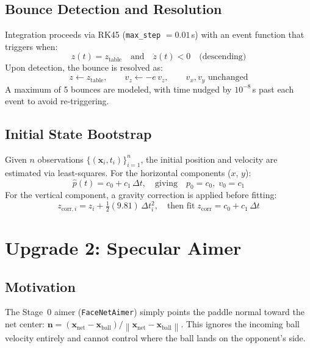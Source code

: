 \documentclass[11pt,letterpaper]{article}
\newcommand{\vv}[1]{\mathbf{#1}}
\newcommand{\norm}[1]{\left\|#1\right\|}
\begin{document}
\subsection{Bounce Detection and Resolution}

Integration proceeds via RK45 (\texttt{max\_step} $= 0.01$\,s) with an event function that triggers when:
\begin{equation}
    z(t) = z_{\text{table}} \quad \text{and} \quad \dot{z}(t) < 0 \quad \text{(descending)}
\end{equation}
Upon detection, the bounce is resolved as:
\begin{equation}
    z \leftarrow z_{\text{table}}, \qquad v_z \leftarrow -e\,v_z, \qquad v_x, v_y \text{ unchanged}
\end{equation}
A maximum of 5 bounces are modeled, with time nudged by $10^{-8}$\,s past each event to avoid re-triggering.

\subsection{Initial State Bootstrap}

Given $n$ observations $\{(\vv{x}_i, t_i)\}_{i=1}^n$, the initial position and velocity are estimated via least-squares.  For the horizontal components ($x$, $y$):
\begin{equation}
    \hat{p}(t) = c_0 + c_1\,\Delta t, \quad \text{giving} \quad p_0 = c_0,\; v_0 = c_1
\end{equation}
For the vertical component, a gravity correction is applied before fitting:
\begin{equation}
    z_{\text{corr},i} = z_i + \tfrac{1}{2}(9.81)\,\Delta t_i^2, \quad \text{then fit}\; z_{\text{corr}} = c_0 + c_1\,\Delta t
\end{equation}

\section{Upgrade 2: Specular Aimer}
\label{sec:aimer}

\subsection{Motivation}

The Stage~0 aimer (\texttt{FaceNetAimer}) simply points the paddle normal toward the net center: $\vv{n} = (\vv{x}_{\text{net}} - \vv{x}_{\text{ball}}) / \norm{\vv{x}_{\text{net}} - \vv{x}_{\text{ball}}}$.  This ignores the incoming ball velocity entirely and cannot control where the ball lands on the opponent's side.
\end{document}

